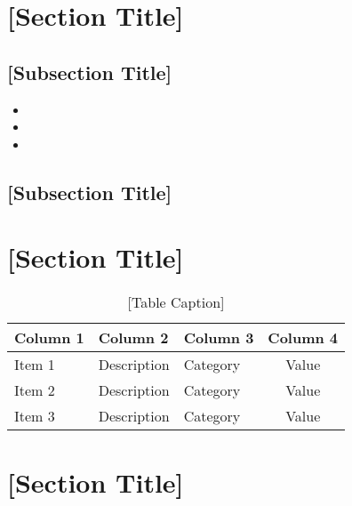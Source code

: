 \documentclass[a4paper,12pt]{article}
\begin{document}
\section{{[Section Title]}}
\label{sec:section3}

\lipsum[8-9]

\subsection{{[Subsection Title]}}
\begin{itemize}[left=1em, itemsep=0pt, topsep=0pt] 
    \item \lipsum[10][1-2]
    \item \lipsum[10][3-4]
    \item \lipsum[10][5-6]
\end{itemize}

\subsection{{[Subsection Title]}}
\lipsum[11]

\newpage

\section{{[Section Title]}}
\label{sec:section4}

\lipsum[12-13]

\begin{center}
    \begin{table}[h!]
    \small
    \caption{[Table Caption]}
    \renewcommand{\arraystretch}{1.25}
    \label{tab:example_table}
    \begin{tabular}{|l|l|l|c|}
    \hline
    \textbf{Column 1} & \textbf{Column 2} & \textbf{Column 3} & \textbf{Column 4} \\
    \hline
    Item 1 & Description & Category & Value \\
    Item 2 & Description & Category & Value \\
    Item 3 & Description & Category & Value \\
    \hline
    \end{tabular}
    \end{table}
\end{center}

\newpage

\section{{[Section Title]}}
\label{sec:section5}
\end{document}
